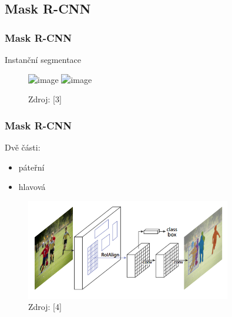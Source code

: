 \documentclass{beamer}
\begin{document}

\subsection{Mask R-CNN}

\begin{frame}

\frametitle{Mask R-CNN}

Instanční segmentace

\begin{figure}[ht]
	\includegraphics<1>[width=0.9\textwidth]{pictures/segmentations.png}
	\includegraphics<2>[width=0.65\textwidth]{pictures/instance-segmentation.png}
	\caption{Zdroj: [3]}
\end{figure}

\end{frame}


\begin{frame}

\frametitle{Mask R-CNN}

Dvě části:
\begin{itemize}
	\item páteřní
	\item hlavová
\end{itemize}

\begin{figure}[ht]
	\includegraphics[width=0.8\textwidth]{pictures/maskrcnn.png}
	\caption{Zdroj: [4]}
\end{figure}

\end{frame}

\end{document}
